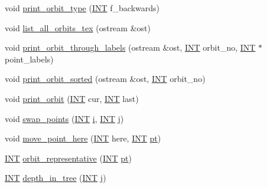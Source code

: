 \begin{DoxyCompactItemize}
void \mbox{\hyperlink{classschreier_a1005845546e5146419a644016bc9b869}{print\+\_\+orbit\+\_\+type}} (\mbox{\hyperlink{galois_8h_a09fddde158a3a20bd2dcadb609de11dc}{I\+NT}} f\+\_\+backwards)
\item 
void \mbox{\hyperlink{classschreier_ab75c2415d4b4afa3a1a713f08ec6e5f6}{list\+\_\+all\+\_\+orbits\+\_\+tex}} (ostream \&ost)
\item 
void \mbox{\hyperlink{classschreier_a49b95cdd68410b614ed74dc7ddf72fe3}{print\+\_\+orbit\+\_\+through\+\_\+labels}} (ostream \&ost, \mbox{\hyperlink{galois_8h_a09fddde158a3a20bd2dcadb609de11dc}{I\+NT}} orbit\+\_\+no, \mbox{\hyperlink{galois_8h_a09fddde158a3a20bd2dcadb609de11dc}{I\+NT}} $\ast$point\+\_\+labels)
\item 
void \mbox{\hyperlink{classschreier_a8bd8fc10c3d25da9ac28af1f3aeb3c05}{print\+\_\+orbit\+\_\+sorted}} (ostream \&ost, \mbox{\hyperlink{galois_8h_a09fddde158a3a20bd2dcadb609de11dc}{I\+NT}} orbit\+\_\+no)
\item 
void \mbox{\hyperlink{classschreier_ab8236b64028fe047d681ca0d6435cf82}{print\+\_\+orbit}} (\mbox{\hyperlink{galois_8h_a09fddde158a3a20bd2dcadb609de11dc}{I\+NT}} cur, \mbox{\hyperlink{galois_8h_a09fddde158a3a20bd2dcadb609de11dc}{I\+NT}} last)
\item 
void \mbox{\hyperlink{classschreier_a2ffcc9098873cfbd14eca34ab4827db7}{swap\+\_\+points}} (\mbox{\hyperlink{galois_8h_a09fddde158a3a20bd2dcadb609de11dc}{I\+NT}} \mbox{\hyperlink{alphabet2_8_c_acb559820d9ca11295b4500f179ef6392}{i}}, \mbox{\hyperlink{galois_8h_a09fddde158a3a20bd2dcadb609de11dc}{I\+NT}} \mbox{\hyperlink{alphabet2_8_c_a37d972ae0b47b9099e30983131d31916}{j}})
\item 
void \mbox{\hyperlink{classschreier_a1df8fa2329898d26266aecd51363e89b}{move\+\_\+point\+\_\+here}} (\mbox{\hyperlink{galois_8h_a09fddde158a3a20bd2dcadb609de11dc}{I\+NT}} here, \mbox{\hyperlink{galois_8h_a09fddde158a3a20bd2dcadb609de11dc}{I\+NT}} \mbox{\hyperlink{clique__finder_8_c_aec1f1a2b30fdca8844c2932384483145}{pt}})
\item 
\mbox{\hyperlink{galois_8h_a09fddde158a3a20bd2dcadb609de11dc}{I\+NT}} \mbox{\hyperlink{classschreier_afef40c06c5de554ed97106fec2387494}{orbit\+\_\+representative}} (\mbox{\hyperlink{galois_8h_a09fddde158a3a20bd2dcadb609de11dc}{I\+NT}} \mbox{\hyperlink{clique__finder_8_c_aec1f1a2b30fdca8844c2932384483145}{pt}})
\item 
\mbox{\hyperlink{galois_8h_a09fddde158a3a20bd2dcadb609de11dc}{I\+NT}} \mbox{\hyperlink{classschreier_a1967bab729b91dfe70d514f820d13772}{depth\+\_\+in\+\_\+tree}} (\mbox{\hyperlink{galois_8h_a09fddde158a3a20bd2dcadb609de11dc}{I\+NT}} \mbox{\hyperlink{alphabet2_8_c_a37d972ae0b47b9099e30983131d31916}{j}})

\end{DoxyCompactItemize}
